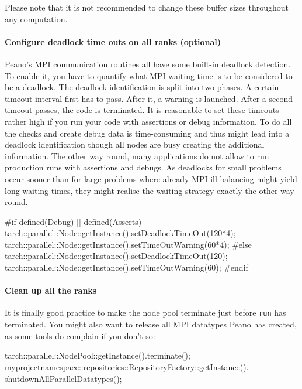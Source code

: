 \noindent
Please note that it is not recommended to change these buffer sizes throughout
any computation. 


\paragraph{Configure deadlock time outs on all ranks (optional)}
Peano's MPI communication routines all have some built-in deadlock detection. 
To enable it, you have to quantify what MPI waiting time is to be considered to
be a deadlock.
The deadlock identification is split into two phases.
A certain timeout interval first has to pass.
After it, a warning is launched. 
After a second timeout passes, the code is terminated.
It is reasonable to set these timeouts rather high if you run your code with
assertions or debug information.
To do all the checks and create debug data is time-consuming and thus might lead
into a deadlock identification though all nodes are busy creating the additional
information.
The other way round, many applications do not allow to run production runs with
assertions and debugs.
As deadlocks for small problems occur sooner than for large problems where
already MPI ill-balancing might yield long waiting times, they might realise the
waiting strategy exactly the other way round.

\begin{code}
  #if defined(Debug) || defined(Asserts)
  tarch::parallel::Node::getInstance().setDeadlockTimeOut(120*4);
  tarch::parallel::Node::getInstance().setTimeOutWarning(60*4);
  #else
  tarch::parallel::Node::getInstance().setDeadlockTimeOut(120);
  tarch::parallel::Node::getInstance().setTimeOutWarning(60);
  #endif
\end{code}

\paragraph{Clean up all the ranks}
It is finally good practice to make the node pool terminate just before
\texttt{run} has terminated.
You might also want to release all MPI datatypes Peano has created, as some
tools do complain if you don't so:

\begin{code}
tarch::parallel::NodePool::getInstance().terminate();
myprojectnamespace::repositories::RepositoryFactory::getInstance().
  shutdownAllParallelDatatypes();
\end{code}

